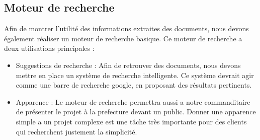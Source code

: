 \subsection{Moteur de recherche}
Afin de montrer l'utilité des informations extraites des documents, nous devons également réaliser un moteur de recherche basique.
Ce moteur de recherche a deux utilisations principales : 
\begin{itemize}
\item Suggestions de recherche :
Afin de retrouver des documents, nous devons mettre en place un système de recherche intelligente.
Ce système devrait agir comme une barre de recherche google, en proposant des résultats pertinents.
\item Apparence :
Le moteur de recherche permettra aussi a notre commanditaire de présenter le projet à la prefecture devant un public.
Donner une apparence simple a un projet complexe est une tâche très importante pour des clients qui recherchent justement la simplicité.
\end{itemize}




